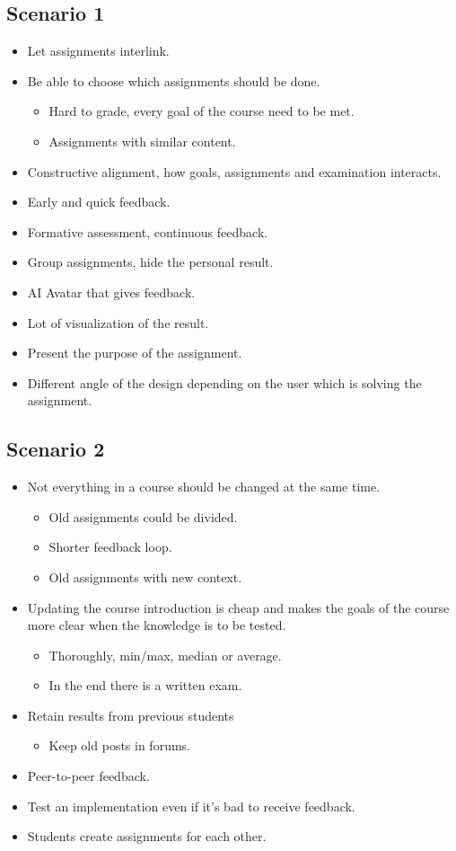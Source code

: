 \subsection*{Scenario 1}
\begin{itemize}
\item Let assignments interlink.
\item Be able to choose which assignments should be done.
    \begin{itemize}
    \item Hard to grade, every goal of the course need to be met.
    \item Assignments with similar content.
    \end{itemize}
\item Constructive alignment, how goals, assignments and examination interacts.
\item Early and quick feedback.
\item Formative assessment, continuous feedback.
\item Group assignments, hide the personal result.
\item AI Avatar that gives feedback.
\item Lot of visualization of the result.
\item Present the purpose of the assignment.
\item Different angle of the design depending on the user which is solving the assignment.
\end{itemize}

\subsection*{Scenario 2}
\begin{itemize}
\item Not everything in a course should be changed at the same time.
\begin{itemize}
\item Old assignments could be divided.
\item Shorter feedback loop.
\item Old assignments with new context.
\end{itemize}
\item Updating the course introduction is cheap and makes the goals of the course more clear when the knowledge is to be tested.
\begin{itemize}
\item Thoroughly, min/max, median or average.
\item In the end there is a written exam.
\end{itemize}
\item Retain results from previous students
\begin{itemize}
\item Keep old posts in forums.
\end{itemize}
\item Peer-to-peer feedback.
\item Test an implementation even if it's bad to receive feedback.
\item Students create assignments for each other.
\end{itemize}

